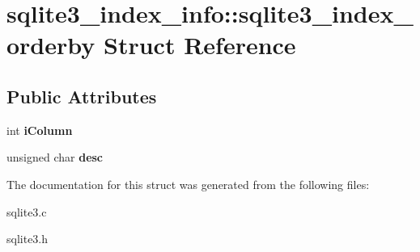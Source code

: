\hypertarget{structsqlite3__index__info_1_1sqlite3__index__orderby}{}\section{sqlite3\+\_\+index\+\_\+info\+:\+:sqlite3\+\_\+index\+\_\+orderby Struct Reference}
\label{structsqlite3__index__info_1_1sqlite3__index__orderby}
\subsection*{Public Attributes}
\begin{DoxyCompactItemize}
\item 
int {\bfseries i\+Column}\hypertarget{structsqlite3__index__info_1_1sqlite3__index__orderby_a266396085bfda9acef3f13eaa170cd2f}{}\label{structsqlite3__index__info_1_1sqlite3__index__orderby_a266396085bfda9acef3f13eaa170cd2f}

\item 
unsigned char {\bfseries desc}\hypertarget{structsqlite3__index__info_1_1sqlite3__index__orderby_a0586d1b5d36221af96aeba8cfc56e9c6}{}\label{structsqlite3__index__info_1_1sqlite3__index__orderby_a0586d1b5d36221af96aeba8cfc56e9c6}

\end{DoxyCompactItemize}


The documentation for this struct was generated from the following files\+:\begin{DoxyCompactItemize}
\item 
sqlite3.\+c\item 
sqlite3.\+h\end{DoxyCompactItemize}
